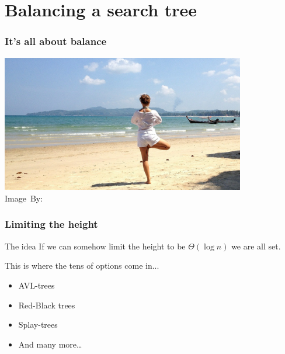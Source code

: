 \section{Balancing a search tree}
\label{sec:balancing_a_search_tree}

\begin{frame}
	\frametitle{It's all about balance}
	\begin{center}
		\includegraphics[width=0.8\textwidth]{figures/balance.jpg}\\
		\hspace*{15pt}\hbox{\scriptsize Image By:}
	\end{center}
\end{frame}

\begin{frame}
	\frametitle{Limiting the height}
	\begin{block}{The idea}
		If we can somehow limit the height to be $\Theta(\log n)$ we are all set.
	\end{block}	
	\pause
	This is where the tens of options come in...
	\begin{itemize}
		\item AVL-trees
		\item Red-Black trees
		\item Splay-trees
		\item And many more\dots
	\end{itemize}
\end{frame}

